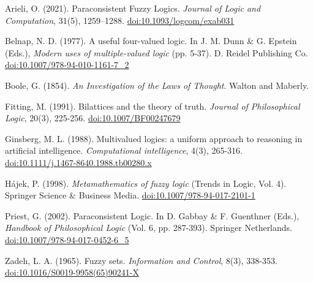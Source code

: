 \documentclass[11pt]{article}
\theoremstyle{remark}
\begin{document}
\begin{thebibliography}{99}

Arieli, O. (2021). Paraconsistent Fuzzy Logics. \textit{Journal of Logic and Computation}, 31(5), 1259--1288. \href{https://academic.oup.com/logcom/article/31/5/1259/6273538}{doi:10.1093/logcom/exab031}

Belnap, N. D. (1977). A useful four-valued logic. In J. M. Dunn \& G. Epstein (Eds.), \textit{Modern uses of multiple-valued logic} (pp. 5-37). D. Reidel Publishing Co. \href{https://doi.org/10.1007/978-94-010-1161-7_2}{doi:10.1007/978-94-010-1161-7\_2}

Boole, G. (1854). \textit{An Investigation of the Laws of Thought}. Walton and Maberly.

Fitting, M. (1991). Bilattices and the theory of truth. \textit{Journal of Philosophical Logic}, 20(3), 225-256. \href{https://doi.org/10.1007/BF00247679}{doi:10.1007/BF00247679}

Ginsberg, M. L. (1988). Multivalued logics: a uniform approach to reasoning in artificial intelligence. \textit{Computational intelligence}, 4(3), 265-316. \href{https://doi.org/10.1111/j.1467-8640.1988.tb00280.x}{doi:10.1111/j.1467-8640.1988.tb00280.x}

Hájek, P. (1998). \textit{Metamathematics of fuzzy logic} (Trends in Logic, Vol. 4). Springer Science \& Business Media. \href{https://doi.org/10.1007/978-94-017-2101-1}{doi:10.1007/978-94-017-2101-1}

Priest, G. (2002). Paraconsistent Logic. In D. Gabbay \& F. Guenthner (Eds.), \textit{Handbook of Philosophical Logic} (Vol. 6, pp. 287-393). Springer Netherlands. \href{https://doi.org/10.1007/978-94-017-0452-6_5}{doi:10.1007/978-94-017-0452-6\_5}

Zadeh, L. A. (1965). Fuzzy sets. \textit{Information and Control}, 8(3), 338-353. \href{https://doi.org/10.1016/S0019-9958(65)90241-X}{doi:10.1016/S0019-9958(65)90241-X}

\end{thebibliography}
\end{document}
